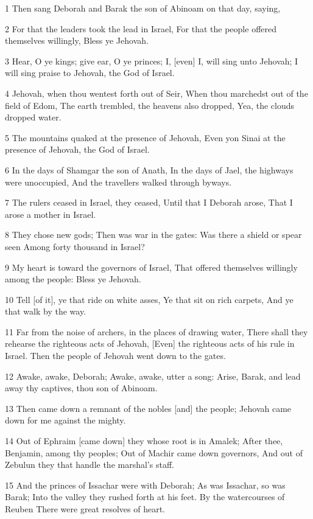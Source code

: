 \par 1 Then sang Deborah and Barak the son of Abinoam on that day, saying,
\par 2 For that the leaders took the lead in Israel, For that the people offered themselves willingly, Bless ye Jehovah.
\par 3 Hear, O ye kings; give ear, O ye princes; I, [even] I, will sing unto Jehovah; I will sing praise to Jehovah, the God of Israel.
\par 4 Jehovah, when thou wentest forth out of Seir, When thou marchedst out of the field of Edom, The earth trembled, the heavens also dropped, Yea, the clouds dropped water.
\par 5 The mountains quaked at the presence of Jehovah, Even yon Sinai at the presence of Jehovah, the God of Israel.
\par 6 In the days of Shamgar the son of Anath, In the days of Jael, the highways were unoccupied, And the travellers walked through byways.
\par 7 The rulers ceased in Israel, they ceased, Until that I Deborah arose, That I arose a mother in Israel.
\par 8 They chose new gods; Then was war in the gates: Was there a shield or spear seen Among forty thousand in Israel?
\par 9 My heart is toward the governors of Israel, That offered themselves willingly among the people: Bless ye Jehovah.
\par 10 Tell [of it], ye that ride on white asses, Ye that sit on rich carpets, And ye that walk by the way.
\par 11 Far from the noise of archers, in the places of drawing water, There shall they rehearse the righteous acts of Jehovah, [Even] the righteous acts of his rule in Israel. Then the people of Jehovah went down to the gates.
\par 12 Awake, awake, Deborah; Awake, awake, utter a song: Arise, Barak, and lead away thy captives, thou son of Abinoam.
\par 13 Then came down a remnant of the nobles [and] the people; Jehovah came down for me against the mighty.
\par 14 Out of Ephraim [came down] they whose root is in Amalek; After thee, Benjamin, among thy peoples; Out of Machir came down governors, And out of Zebulun they that handle the marshal's staff.
\par 15 And the princes of Issachar were with Deborah; As was Issachar, so was Barak; Into the valley they rushed forth at his feet. By the watercourses of Reuben There were great resolves of heart.
